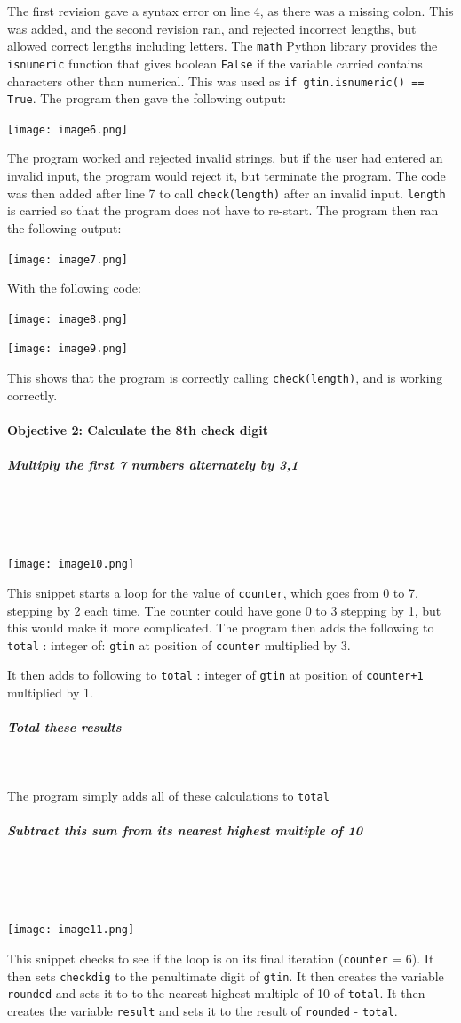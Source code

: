 \documentclass[a4paper]{article}
\begin{document}
The first revision gave a syntax error on line 4, as there was a missing colon. This was added, and the second revision ran, and rejected incorrect lengths, but allowed correct lengths including letters. The \verb|math| Python library provides the \verb|isnumeric| function that gives boolean \verb|False| if the variable carried contains characters other than numerical. This was used as \verb|if gtin.isnumeric() == True|. The program then gave the following output: \par
\noindent\texttt{[image: image6.png]} \par
The program worked and rejected invalid strings, but if the user had entered an invalid input, the program would reject it, but terminate the program. The code was then added after line 7 to call \verb|check(length)| after an invalid input. \verb|length| is carried so that the program does not have to re-start. The program then ran the following output: \par
\noindent\texttt{[image: image7.png]} \par
With the following code: \par
\noindent\texttt{[image: image8.png]} ~ \par
\noindent\texttt{[image: image9.png]} ~\par
This shows that the program is correctly calling \verb|check(length)|, and is working correctly.
\newpage
\paragraph{Objective 2: Calculate the 8th check digit}
\subparagraph{Multiply the first 7 numbers alternately by 3,1} ~ \par ~ \par
\noindent\texttt{[image: image10.png]} ~\par
This snippet starts a loop for the value of \verb|counter|, which goes from 0 to 7, stepping by 2 each time. The counter could have gone 0 to 3 stepping by 1, but this would make it more complicated. The program then adds the following to \verb|total| : integer of: \verb|gtin| at position of \verb|counter| multiplied by 3. \par
\noindent It then adds to following to \verb|total| : integer of \verb|gtin| at position of \verb|counter+1| multiplied by 1.
\subparagraph{Total these results} ~\par
\noindent The program simply adds all of these calculations to \verb|total|
\subparagraph{Subtract this sum from its nearest highest multiple of 10} ~\par ~\par
\noindent\texttt{[image: image11.png]} ~\par
This snippet checks to see if the loop is on its final iteration (\verb|counter| = 6). It then sets \verb|checkdig| to the penultimate digit of \verb?gtin?. It then creates the variable \verb?rounded? and sets it to to the nearest highest multiple of 10 of \verb?total?. It then creates the variable \verb?result? and sets it to the result of \verb?rounded? - \verb?total?.
\end{document}
